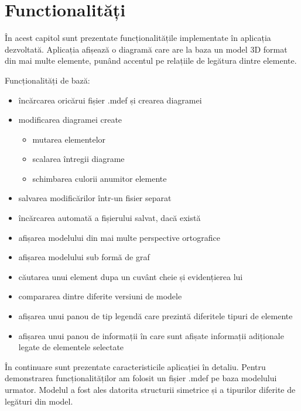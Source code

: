 \newpage
\section{Functionalități}

În acest capitol sunt prezentate funcționalitățile implementate în aplicația dezvoltată. Aplicația afișează o diagramă 
care are la baza un model 3D format din mai multe elemente, punând accentul pe relațiile de legătura dintre elemente.\newline

Funcționalități de bază:
\begin{itemize}
    \item încărcarea oricărui fișier .mdef și crearea diagramei
    \item modificarea diagramei create
    \begin{itemize}
        \item mutarea elementelor
        \item scalarea întregii diagrame
        \item schimbarea culorii anumitor elemente
    \end{itemize} 
    \item salvarea modificărilor într-un fisier separat
    \item încărcarea automată a fișierului salvat, dacă există
    \item afișarea modelului din mai multe perspective ortografice
    \item afișarea modelului sub formă de graf
    \item căutarea unui element dupa un cuvânt cheie și evidențierea lui
    \item compararea dintre diferite versiuni de modele
    \item afișarea unui panou de tip legendă care prezintă diferitele tipuri de elemente
    \item afișarea unui panou de informații în care sunt afișate informații adiționale legate de elementele selectate
\end{itemize}

În continuare sunt prezentate caracteristicile aplicației în detaliu. Pentru demonstrarea funcționalităților am folosit un fișier .mdef
pe baza modelului urmator. Modelul a fost ales datorita structurii simetrice și a tipurilor diferite de legături din model.


